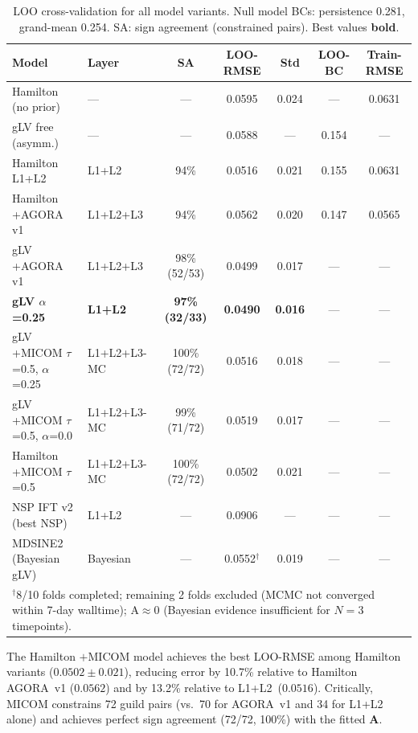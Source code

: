 \documentclass[11pt,a4paper]{article}
\newcommand{\bA}{\mathbf{A}}
\begin{document}
\begin{table}[htb]
\centering
\caption{LOO cross-validation for all model variants. Null model BCs: persistence 0.281,
         grand-mean 0.254. SA: sign agreement (constrained pairs). Best values \textbf{bold}.}
\label{tab:comparison}
\small
\begin{tabular}{llccccc}
\toprule
Model & Layer & SA & LOO-RMSE & Std & LOO-BC & Train-RMSE \\
\midrule
Hamilton (no prior)   & ---          & ---         & 0.0595 & 0.024 & ---   & 0.0631 \\
gLV free (asymm.)     & ---          & ---         & 0.0588 & ---   & 0.154 & --- \\
Hamilton L1+L2        & L1+L2        & 94\%        & 0.0516 & 0.021 & 0.155 & 0.0631 \\
Hamilton +AGORA v1    & L1+L2+L3     & 94\%        & 0.0562 & 0.020 & 0.147 & 0.0565 \\
gLV +AGORA v1         & L1+L2+L3     & 98\% (52/53)& 0.0499 & 0.017 & ---   & --- \\
\textbf{gLV $\alpha$=0.25}     & \textbf{L1+L2}        & \textbf{97\% (32/33)}& \textbf{0.0490} & \textbf{0.016} & ---   & --- \\
gLV +MICOM $\tau$=0.5, $\alpha$=0.25 & L1+L2+L3-MC & 100\% (72/72)& 0.0516 & 0.018 & ---   & --- \\
gLV +MICOM $\tau$=0.5, $\alpha$=0.0  & L1+L2+L3-MC & 99\% (71/72) & 0.0519 & 0.017 & ---   & --- \\
Hamilton +MICOM $\tau$=0.5 & L1+L2+L3-MC & 100\% (72/72) & 0.0502 & 0.021 & --- & --- \\
\midrule
NSP IFT v2 (best NSP) & L1+L2        & ---         & 0.0906 & ---   & ---   & --- \\
MDSINE2 (Bayesian gLV) & Bayesian     & ---         & 0.0552$^\dagger$ & 0.019 & --- & --- \\
\bottomrule
\multicolumn{7}{l}{\small $^\dagger$8/10 folds completed; remaining 2 folds excluded (MCMC not converged within 7-day walltime); A$\approx$0 (Bayesian evidence insufficient for $N{=}3$ timepoints).} \\
\end{tabular}
\end{table}

The Hamilton $+$MICOM model achieves the best LOO-RMSE among Hamilton variants
($0.0502 \pm 0.021$), reducing error by 10.7\% relative to Hamilton AGORA~v1 ($0.0562$)
and by 13.2\% relative to L1+L2~($0.0516$).
Critically, MICOM constrains 72 guild pairs (vs.\ 70 for AGORA~v1 and 34 for L1+L2 alone)
and achieves perfect sign agreement (72/72, 100\%) with the fitted $\bA$.
\end{document}
